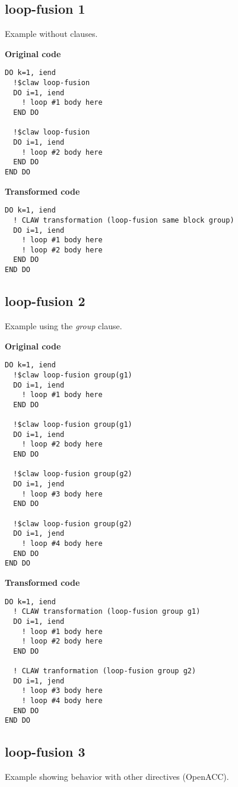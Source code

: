 \documentclass{article}
\begin{document}
\subsection{loop-fusion 1}
Example without clauses. 

\textbf{Original code}
\begin{lstlisting}
DO k=1, iend
  !$claw loop-fusion
  DO i=1, iend
    ! loop #1 body here
  END DO

  !$claw loop-fusion
  DO i=1, iend
    ! loop #2 body here
  END DO
END DO
\end{lstlisting}

\textbf{Transformed code}
\begin{lstlisting}
DO k=1, iend
  ! CLAW transformation (loop-fusion same block group)
  DO i=1, iend
    ! loop #1 body here
    ! loop #2 body here
  END DO
END DO
\end{lstlisting}

\subsection{loop-fusion 2}
\label{loop-fusion2}
Example using the \textit{group} clause.

\textbf{Original code}
\begin{lstlisting}
DO k=1, iend
  !$claw loop-fusion group(g1)
  DO i=1, iend
    ! loop #1 body here
  END DO

  !$claw loop-fusion group(g1)
  DO i=1, iend
    ! loop #2 body here
  END DO

  !$claw loop-fusion group(g2)
  DO i=1, jend
    ! loop #3 body here
  END DO

  !$claw loop-fusion group(g2)
  DO i=1, jend
    ! loop #4 body here
  END DO
END DO
\end{lstlisting}


\textbf{Transformed code}
\begin{lstlisting}
DO k=1, iend
  ! CLAW transformation (loop-fusion group g1)
  DO i=1, iend
    ! loop #1 body here
    ! loop #2 body here
  END DO

  ! CLAW tranformation (loop-fusion group g2)
  DO i=1, jend
    ! loop #3 body here
    ! loop #4 body here
  END DO
END DO
\end{lstlisting}

\subsection{loop-fusion 3}
\label{loop-fusion3}
Example showing behavior with other directives (OpenACC). 
\end{document}
